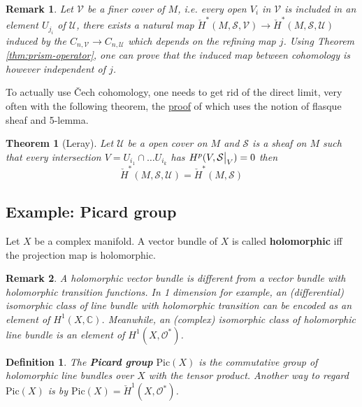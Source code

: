\documentclass[11pt]{article}
\newtheorem{remark}{Remark}
\newtheorem{theorem}{Theorem}
\newtheorem{definition}{Definition}
\newcommand\restr[2]{{%
\left.\kern-\nulldelimiterspace %
#1 %
\vphantom{\big|} %
\right|_{#2} %
}}
\begin{document}
\begin{remark}
Let \(\mathcal{V}\) be a finer cover of \(M\), i.e. every open \(V_i\) in \(\mathcal{V}\) is included in an element \(U_{j_i}\) of \(\mathcal{U}\), there exists
a natural map \(\check{H}^*(M, \mathcal{S},\mathcal{V}) \longrightarrow \check{H}^*(M,
\mathcal{S},\mathcal{U})\) induced by the \(C_{n,\mathcal{V}} \longrightarrow
C_{n,\mathcal{U}}\) which depends on the refining map \(j\). Using Theorem
\ref{thm:prism-operator}, one can prove that the induced map between cohomology is however
independent of \(j\).
\end{remark}

To actually use Čech cohomology, one needs to get rid of the direct limit, very often with
the following theorem, the \href{https://math.stackexchange.com/questions/1897164/leray-theorem-for-acyclic-covering}{proof} of which uses the notion of flasque sheaf and 5-lemma.

\begin{theorem}[Leray]
\label{thm:leray}
Let \(\mathcal{U}\) be a open cover on \(M\) and \(\mathcal{S}\) is a sheaf on \(M\) such that every intersection \(V =  U_{i_1}\cap \dots U_{i_k}\) has \(H^p(V,
\restr{\mathcal{S}}{V})=0\) then
\[
\check{H}^*(M, \mathcal{S}, \mathcal{U}) = \check{H}^*(M,\mathcal{S})
\]
\end{theorem}



\subsection{Example: Picard group}
\label{sec:org9316080}
Let \(X\) be a complex manifold. A vector bundle of \(X\) is called \textbf{holomorphic}
iff the projection map is holomorphic. 
\begin{remark}
A holomorphic vector bundle is different from a vector bundle with holomorphic transition
functions. In 1 dimension for example, an (differential) isomorphic class of line bundle with holomorphic
transition can be encoded as an element of \(H^1(X, \mathbb{C})\). Meanwhile, an
(complex) isomorphic class of holomorphic line bundle is an element of \(H^1(X, \mathcal{O}^*)\).
\end{remark}


\begin{definition}
The \textbf{Picard group} \(\text{Pic}(X)\) is the commutative group of holomorphic line
bundles over \(X\) with the tensor product. Another way to regard \(\text{Pic}(X)\) is
by \(\text{Pic}(X) = \check{H}^1(X, \mathcal{O}^*)\).
\end{definition}
\end{document}
